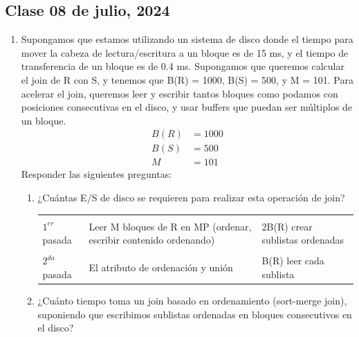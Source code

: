 \documentclass{templateNote}
\begin{document}
\subsection{Clase 08 de julio, 2024}
\begin{enumerate}
    \item Supongamos que estamos utilizando un sistema de disco donde el tiempo para mover la cabeza de lectura/escritura a un bloque es de 15 ms, y el tiempo de transferencia de un bloque es de 0.4 ms. Supongamos que queremos calcular el join de R con S, y tenemos que B(R) = 1000, B(S) = 500, y M = 101. Para acelerar el join, queremos leer y escribir tantos bloques como podamos con posiciones consecutivas en el disco, y usar buffers que puedan ser múltiplos de un bloque.
    \begin{align*}
        B(R) &= 1000 \\
        B(S) &= 500 \\
        M &= 101
    \end{align*}
    Responder las siguientes preguntas:
    \begin{enumerate}
        \item ¿Cuántas E/S de disco se requieren para realizar esta operación de join? \newline
        \begin{table}[H]
            \centering
            \begin{tabular}{|p{3cm}|p{6cm}|p{6cm}|}
                \hline
                &&\\
                $1^{er}$ pasada & Leer M bloques de R en MP (ordenar, escribir contenido ordenando) & 2B(R) crear sublistas ordenadas \\
                &&\\
                \hline
                $2^{da}$ pasada & El atributo de ordenación y unión & B(R) leer cada sublista \\
                \hline
            \end{tabular}
        \end{table}

        \item ¿Cuánto tiempo toma un join basado en ordenamiento (sort-merge join), suponiendo que escribimos sublistas ordenadas en bloques consecutivos en el disco?
    \end{enumerate}


\end{enumerate}
\end{document}
